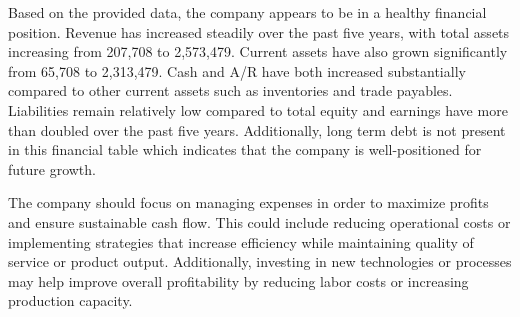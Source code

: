 

Based on the provided data, the company appears to be in a healthy financial position. Revenue has increased steadily over the past five years, with total assets increasing from 207,708 to 2,573,479. Current assets have also grown significantly from 65,708 to 2,313,479. Cash and A/R have both increased substantially compared to other current assets such as inventories and trade payables. Liabilities remain relatively low compared to total equity and earnings have more than doubled over the past five years. Additionally, long term debt is not present in this financial table which indicates that the company is well-positioned for future growth. 

The company should focus on managing expenses in order to maximize profits and ensure sustainable cash flow. This could include reducing operational costs or implementing strategies that increase efficiency while maintaining quality of service or product output. Additionally, investing in new technologies or processes may help improve overall profitability by reducing labor costs or increasing production capacity.